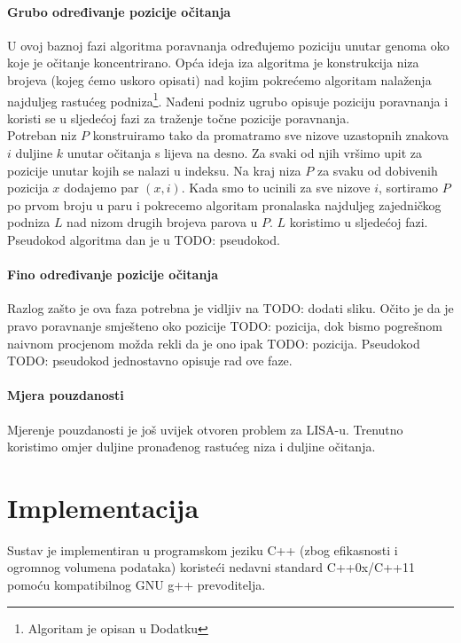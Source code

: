 \documentclass[times, utf8, diplomski]{fer}
\begin{document}
\subsubsection{Grubo određivanje pozicije očitanja}

U ovoj baznoj fazi algoritma poravnanja određujemo poziciju unutar genoma oko koje je očitanje koncentrirano. Opća ideja iza algoritma je konstrukcija niza brojeva (kojeg ćemo uskoro opisati) nad kojim pokrećemo algoritam nalaženja najduljeg rastućeg podniza\footnote{Algoritam je opisan u Dodatku}. Nađeni podniz ugrubo opisuje poziciju poravnanja i koristi se u sljedećoj fazi za traženje točne pozicije poravnanja.\\
Potreban niz $P$ konstruiramo tako da promatramo sve nizove uzastopnih znakova $i$ duljine $k$ unutar očitanja s lijeva na desno. Za svaki od njih vršimo upit za pozicije unutar kojih se nalazi u indeksu. Na kraj niza $P$ za svaku od dobivenih pozicija $x$ dodajemo par $(x,i)$. Kada smo to ucinili za sve nizove $i$, sortiramo $P$ po prvom broju u paru i pokrecemo algoritam pronalaska najduljeg zajedničkog podniza $L$ nad nizom drugih brojeva parova u $P$. $L$ koristimo u sljedećoj fazi. Pseudokod algoritma dan je u TODO: pseudokod.

\subsubsection{Fino određivanje pozicije očitanja}

Razlog zašto je ova faza potrebna je vidljiv na TODO: dodati sliku. Očito je da je pravo poravnanje smješteno oko pozicije TODO: pozicija, dok bismo pogrešnom naivnom procjenom možda rekli da je ono ipak TODO: pozicija. Pseudokod TODO: pseudokod jednostavno opisuje rad ove faze.

\subsubsection{Mjera pouzdanosti}

Mjerenje pouzdanosti je još uvijek otvoren problem za LISA-u. Trenutno koristimo omjer duljine pronađenog rastućeg niza i duljine očitanja.

\chapter{Implementacija}

Sustav je implementiran u programskom jeziku C++ (zbog efikasnosti i ogromnog volumena podataka) koristeći nedavni standard C++0x/C++11 pomoću kompatibilnog GNU g++ prevoditelja.
\end{document}
